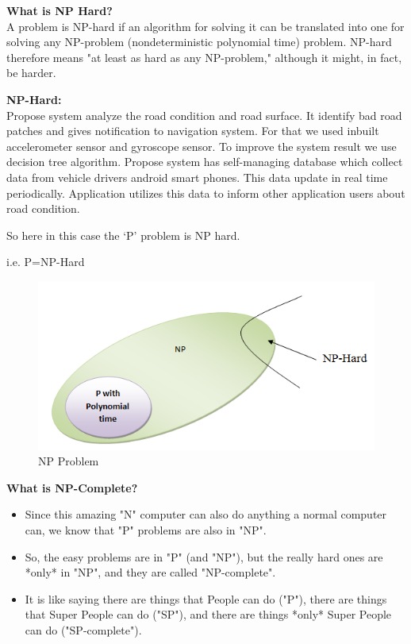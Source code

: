 \documentclass[oneside,a4paper,12pt]{report}
\begin{document}
\begin{appendices}
\textbf{What is NP Hard?}\\
A problem is NP-hard if an algorithm for solving it can be translated into one for solving any NP-problem (nondeterministic polynomial time) problem. NP-hard therefore means "at least as hard as any NP-problem," although it might, in fact, be harder.\\
\vspace{1\baselineskip}

\textbf{NP-Hard:}\\
Propose system analyze the road condition and road surface. It identify bad road patches and gives notification to navigation system. For that we used inbuilt accelerometer sensor and gyroscope sensor. To improve the system result we use decision tree algorithm. Propose system has self-managing database which collect data from vehicle drivers android smart phones. This data update in real time periodically. Application utilizes this data to inform other application users about road condition.

So here in this case the ‘P’ problem is NP hard.

i.e. P=NP-Hard

\begin{figure}[ht!]
	\centering
	\includegraphics[width=\linewidth]{np (1).png}
	\caption{NP Problem}
	\label{fig:NP Problem}
\end{figure}

\textbf{What is NP-Complete?}\\

\begin{itemize}
	\item Since this amazing "N" computer can also do anything a normal computer can, we know that "P" problems are also in "NP".
	\item So, the easy problems are in "P" (and "NP"), but the really hard ones are *only* in "NP", and they are called "NP-complete".
	\item It is like saying there are things that People can do ("P"), there are things that Super People can do ("SP"), and there are things *only* Super People can do ("SP-complete").
\end{itemize}


\end{appendices}
\end{document}
